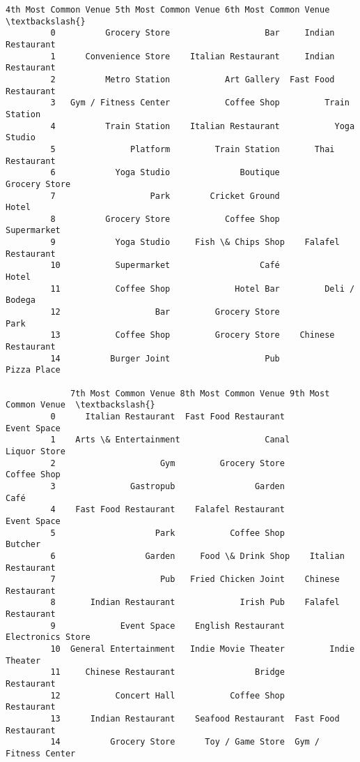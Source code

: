 \documentclass[11pt]{article}
\begin{document}
\begin{Verbatim}[commandchars=\\\{\}]
            4th Most Common Venue 5th Most Common Venue 6th Most Common Venue  \textbackslash{}
         0          Grocery Store                   Bar     Indian Restaurant   
         1      Convenience Store    Italian Restaurant     Indian Restaurant   
         2          Metro Station           Art Gallery  Fast Food Restaurant   
         3   Gym / Fitness Center           Coffee Shop         Train Station   
         4          Train Station    Italian Restaurant           Yoga Studio   
         5               Platform         Train Station       Thai Restaurant   
         6            Yoga Studio              Boutique         Grocery Store   
         7                   Park        Cricket Ground                 Hotel   
         8          Grocery Store           Coffee Shop           Supermarket   
         9            Yoga Studio     Fish \& Chips Shop    Falafel Restaurant   
         10           Supermarket                  Café                 Hotel   
         11           Coffee Shop             Hotel Bar         Deli / Bodega   
         12                   Bar         Grocery Store                  Park   
         13           Coffee Shop         Grocery Store    Chinese Restaurant   
         14          Burger Joint                   Pub           Pizza Place   
         
             7th Most Common Venue 8th Most Common Venue 9th Most Common Venue  \textbackslash{}
         0      Italian Restaurant  Fast Food Restaurant           Event Space   
         1    Arts \& Entertainment                 Canal          Liquor Store   
         2                     Gym         Grocery Store           Coffee Shop   
         3               Gastropub                Garden                  Café   
         4    Fast Food Restaurant    Falafel Restaurant           Event Space   
         5                    Park           Coffee Shop               Butcher   
         6                  Garden     Food \& Drink Shop    Italian Restaurant   
         7                     Pub   Fried Chicken Joint    Chinese Restaurant   
         8       Indian Restaurant             Irish Pub    Falafel Restaurant   
         9             Event Space    English Restaurant     Electronics Store   
         10  General Entertainment   Indie Movie Theater         Indie Theater   
         11     Chinese Restaurant                Bridge            Restaurant   
         12           Concert Hall           Coffee Shop            Restaurant   
         13      Indian Restaurant    Seafood Restaurant  Fast Food Restaurant   
         14          Grocery Store      Toy / Game Store  Gym / Fitness Center   
         

\end{Verbatim}
\end{document}
